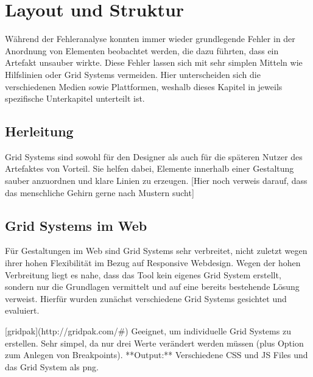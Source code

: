 

\newcommand{\chaptertitle}{Layout und Struktur}

\chapter{\chaptertitle} %

\label{LayoutStruktur} %

\lhead{\chaptername{} \thechapter{} - \emph{\chaptertitle}} %


Während der Fehleranalyse konnten immer wieder grundlegende Fehler in der Anordnung von Elementen beobachtet werden, die dazu führten, dass ein Artefakt unsauber wirkte.
Diese Fehler lassen sich mit sehr simplen Mitteln wie Hilfslinien oder Grid Systems vermeiden.
Hier unterscheiden sich die verschiedenen Medien sowie Plattformen, weshalb dieses Kapitel in jeweils spezifische Unterkapitel unterteilt ist.

\section{Herleitung}
Grid Systems sind sowohl für den Designer als auch für die späteren Nutzer des Artefaktes von Vorteil. Sie helfen dabei, Elemente innerhalb einer Gestaltung sauber anzuordnen und klare Linien zu erzeugen.
[Hier noch verweis darauf, dass das menschliche Gehirn gerne nach Mustern sucht]

\section{Grid Systems im Web}
Für Gestaltungen im Web sind Grid Systems sehr verbreitet, nicht zuletzt wegen ihrer hohen Flexibilität im Bezug auf Responsive Webdesign.
Wegen der hohen Verbreitung liegt es nahe, dass das Tool kein eigenes Grid System erstellt, sondern nur die Grundlagen vermittelt und auf eine bereits bestehende Lösung verweist.
Hierfür wurden zunächst verschiedene Grid Systems gesichtet und evaluiert.

[gridpak](http://gridpak.com/#)
Geeignet, um individuelle Grid Systems zu erstellen. Sehr simpel, da nur drei Werte verändert werden müssen (plus Option zum Anlegen von Breakpoints).
**Output:** Verschiedene CSS und JS Files und das Grid System als png.

